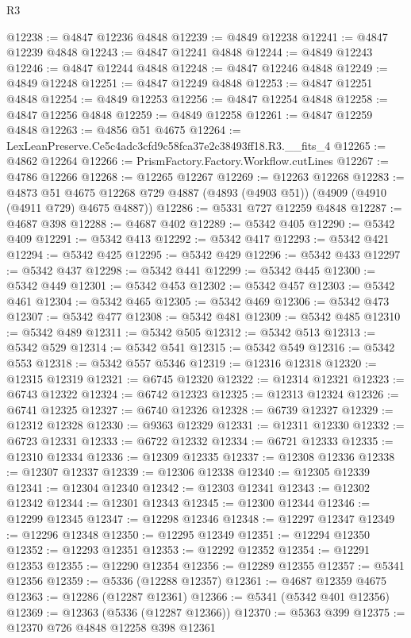 \begin{lexlean}{R3}
\begin{coremodule}
@12238 := @4847 @12236 @4848
@12239 := @4849 @12238
@12241 := @4847 @12239 @4848
@12243 := @4847 @12241 @4848
@12244 := @4849 @12243
@12246 := @4847 @12244 @4848
@12248 := @4847 @12246 @4848
@12249 := @4849 @12248
@12251 := @4847 @12249 @4848
@12253 := @4847 @12251 @4848
@12254 := @4849 @12253
@12256 := @4847 @12254 @4848
@12258 := @4847 @12256 @4848
@12259 := @4849 @12258
@12261 := @4847 @12259 @4848
@12263 := @4856 @51 @4675
@12264 := LexLeanPreserve.Ce5c4adc3cfd9c58fca37e2c38493ff18.R3.__fits_4
@12265 := @4862 @12264
@12266 := PrismFactory.Factory.Workflow.cutLines
@12267 := @4786 @12266
@12268 := @12265 @12267
@12269 := @12263 @12268
@12283 := @4873
    @51
    @4675
    @12268
    @729
    @4887
    (@4893 (@4903 @51))
    (@4909 (@4910 (@4911 @729) @4675 @4887))
@12286 := @5331 @727 @12259 @4848
@12287 := @4687 @398
@12288 := @4687 @402
@12289 := @5342 @405
@12290 := @5342 @409
@12291 := @5342 @413
@12292 := @5342 @417
@12293 := @5342 @421
@12294 := @5342 @425
@12295 := @5342 @429
@12296 := @5342 @433
@12297 := @5342 @437
@12298 := @5342 @441
@12299 := @5342 @445
@12300 := @5342 @449
@12301 := @5342 @453
@12302 := @5342 @457
@12303 := @5342 @461
@12304 := @5342 @465
@12305 := @5342 @469
@12306 := @5342 @473
@12307 := @5342 @477
@12308 := @5342 @481
@12309 := @5342 @485
@12310 := @5342 @489
@12311 := @5342 @505
@12312 := @5342 @513
@12313 := @5342 @529
@12314 := @5342 @541
@12315 := @5342 @549
@12316 := @5342 @553
@12318 := @5342 @557 @5346
@12319 := @12316 @12318
@12320 := @12315 @12319
@12321 := @6745 @12320
@12322 := @12314 @12321
@12323 := @6743 @12322
@12324 := @6742 @12323
@12325 := @12313 @12324
@12326 := @6741 @12325
@12327 := @6740 @12326
@12328 := @6739 @12327
@12329 := @12312 @12328
@12330 := @9363 @12329
@12331 := @12311 @12330
@12332 := @6723 @12331
@12333 := @6722 @12332
@12334 := @6721 @12333
@12335 := @12310 @12334
@12336 := @12309 @12335
@12337 := @12308 @12336
@12338 := @12307 @12337
@12339 := @12306 @12338
@12340 := @12305 @12339
@12341 := @12304 @12340
@12342 := @12303 @12341
@12343 := @12302 @12342
@12344 := @12301 @12343
@12345 := @12300 @12344
@12346 := @12299 @12345
@12347 := @12298 @12346
@12348 := @12297 @12347
@12349 := @12296 @12348
@12350 := @12295 @12349
@12351 := @12294 @12350
@12352 := @12293 @12351
@12353 := @12292 @12352
@12354 := @12291 @12353
@12355 := @12290 @12354
@12356 := @12289 @12355
@12357 := @5341 @12356
@12359 := @5336 (@12288 @12357)
@12361 := @4687 @12359 @4675
@12363 := @12286 (@12287 @12361)
@12366 := @5341 (@5342 @401 @12356)
@12369 := @12363 (@5336 (@12287 @12366))
@12370 := @5363 @399
@12375 := @12370 @726 @4848 @12258 @398 @12361

\end{coremodule}
\end{lexlean}
